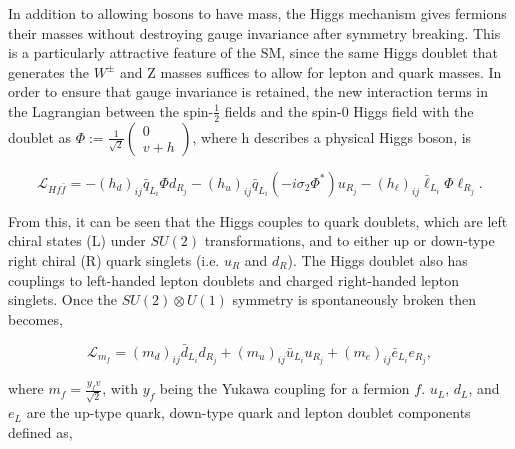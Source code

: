 In addition to allowing bosons to have mass, the Higgs mechanism gives fermions their masses without destroying gauge invariance after symmetry breaking. This is a particularly attractive feature of the SM, since the same Higgs doublet that generates the $W^\pm$ and Z masses suffices to allow for lepton and quark masses. In order to ensure that gauge invariance is retained, the new interaction terms in the Lagrangian between the spin-$\frac{1}{2}$ fields and the spin-0 Higgs field with the doublet as $\Phi := \frac{1}{\sqrt{2}}\begin{pmatrix} 0 \\ v + h \end{pmatrix}$, where h describes a physical Higgs boson, is

\begin{equation}
  \mathcal{L}_{Hf\bar{f}} = -(h_d)_{ij}\bar{q}_{L_i}\Phi d_{R_j} - (h_u)_{ij}\bar{q}_{L_i}(-i\sigma_2\Phi^*)u_{R_j} - (h_\ell)_{ij}\bar{\ell}_{L_i}\Phi \ell_{R_j}.
  \label{eq:fermioncoupling}
\end{equation}

From this, it can be seen that the Higgs couples to quark doublets, which are left chiral states (L) under $SU(2)$ transformations, and to either up or down-type right chiral (R) quark singlets (i.e. $u_{R}$ and $d_{R}$). The Higgs doublet also has couplings to left-handed lepton doublets and charged right-handed lepton singlets. Once the $SU(2)\otimes U(1)$ symmetry is spontaneously broken then  becomes,

\begin{equation}
  \mathcal{L}_{m_f} = (m_d)_{ij}\bar{d}_{L_i}d_{R_j} + (m_u)_{ij}\bar{u}_{L_i}u_{R_j} + (m_e)_{ij}\bar{e}_{L_i}e_{R_j},
  \label{eq:fermionmass}
\end{equation}

where $m_{f} = \frac{y_{f}v}{\sqrt{2}}$, with $y_f$ being the Yukawa coupling for a fermion $f$. $u_L$, $d_L$, and $e_L$ are the up-type quark, down-type quark and lepton doublet components defined as,

